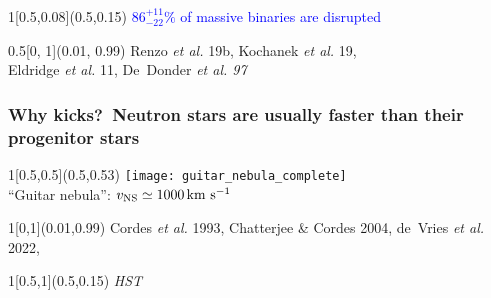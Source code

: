 \documentclass[xcolor=dvipsnames,professionalfonts, aspectratio=169]{beamer}
\begin{document}
\begin{frame}
  \begin{textblock}{1}[0.5,0.08](0.5,0.15)
    \centering\Large \textcolor{Blue}{{\Huge $86^{+11}_{-22}\%$} of massive binaries are
      disrupted}
  \end{textblock}

  \begin{textblock}{0.5}[0, 1](0.01, 0.99) \textcolor{gray!50}{\tiny
      Renzo \emph{et al.} 19b, Kochanek  \emph{et al.} 19,\\[-7pt]
      Eldridge \emph{et al.} 11, De~Donder \emph{et al. 97}}
\end{textblock}

\end{frame}



\begin{frame}[c]
  \frametitle{Why kicks?~Neutron stars are usually faster than their
    progenitor stars}

  \begin{textblock}{1}[0.5,0.5](0.5,0.53)
    \centering
    \texttt{[image: guitar\_nebula\_complete]}\\
    {``Guitar nebula'':  $v_{\rm NS}\simeq1000\,\mathrm{km \ s^{-1}}$}
  \end{textblock}

  \begin{textblock}{1}[0,1](0.01,0.99)
    \textcolor{gray!50}{\tiny Cordes \emph{et al.} 1993, Chatterjee
      \& Cordes 2004, de~Vries
      \emph{et al.} 2022, }
  \end{textblock}
  \begin{textblock}{1}[0.5,1](0.5,0.15)
    \centering \textcolor{gray!50}{\tiny \emph{HST}}
  \end{textblock}


\end{frame}
\end{document}
